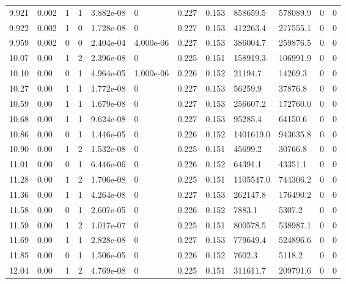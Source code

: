 \documentclass[preview]{standalone}
\begin{document}
{{{\begin{tabular}{L{1.2cm}C{1.2cm} C{0.3cm}C{0.5cm} C{1.4cm}C{1.4cm} C{1.4cm}C{1.4cm} C{1.6cm}C{1.6cm} C{1.6cm}C{1.6cm}}
  9.921  &  0.002  & 1     &  1 &  3.882e-08  & 0  &  0.227&   0.153& 858659.5 & 578089.9   &  0 & 0  \\ 
  9.922  &  0.002  & 1     &  0 &  1.728e-08  & 0  &  0.227&   0.153& 412263.4 & 277555.1   &  0 & 0  \\ 
  9.959  &  0.002  & 0     &  0 &  2.404e-04  & 4.000e-06  &  0.227&   0.153& 386004.7 & 259876.5   &  0 & 0  \\ 
  10.07  &  0.00  & 1     &  2 &  2.396e-08  & 0  &  0.225&   0.151& 158919.3 & 106991.9   &  0 & 0  \\ 
  10.10  &  0.00  & 0     &  1 &  4.964e-05  & 1.000e-06  &  0.226&   0.152& 21194.7 & 14269.3   &  0 & 0  \\ 
  10.27  &  0.00  & 1     &  1 &  1.772e-08  & 0  &  0.227&   0.153& 56259.9 & 37876.8   &  0 & 0  \\ 
  10.59  &  0.00  & 1     &  1 &  1.679e-08  & 0  &  0.227&   0.153& 256607.2 & 172760.0   &  0 & 0  \\ 
  10.68  &  0.00  & 1     &  1 &  9.624e-08  & 0  &  0.227&   0.153& 95285.4 & 64150.6   &  0 & 0  \\ 
  10.86  &  0.00  & 0     &  1 &  1.446e-05  & 0  &  0.226&   0.152& 1401619.0 & 943635.8   &  0 & 0  \\ 
  10.90  &  0.00  & 1     &  2 &  1.532e-08  & 0  &  0.225&   0.151& 45699.2 & 30766.8   &  0 & 0  \\ 
  11.01  &  0.00  & 0     &  1 &  6.446e-06  & 0  &  0.226&   0.152& 64391.1 & 43351.1   &  0 & 0  \\ 
  11.28  &  0.00  & 1     &  2 &  1.706e-08  & 0  &  0.225&   0.151& 1105547.0 & 744306.2   &  0 & 0  \\ 
  11.36  &  0.00  & 1     &  1 &  4.264e-08  & 0  &  0.227&   0.153& 262147.8 & 176490.2   &  0 & 0  \\ 
  11.58  &  0.00  & 0     &  1 &  2.607e-05  & 0  &  0.226&   0.152& 7883.1 & 5307.2   &  0 & 0  \\ 
  11.59  &  0.00  & 1     &  2 &  1.017e-07  & 0  &  0.225&   0.151& 800578.5 & 538987.1   &  0 & 0  \\ 
  11.69  &  0.00  & 1     &  1 &  2.828e-08  & 0  &  0.227&   0.153& 779649.4 & 524896.6   &  0 & 0  \\ 
  11.85  &  0.00  & 0     &  1 &  1.506e-05  & 0  &  0.226&   0.152& 7602.3 & 5118.2   &  0 & 0  \\ 
  12.04  &  0.00  & 1     &  2 &  4.769e-08  & 0  &  0.225&   0.151& 311611.7 & 209791.6   &  0 & 0  \\ 

\end{tabular}}}}
\end{document}
